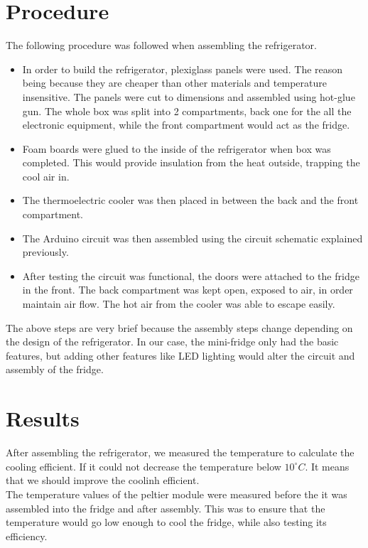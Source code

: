 \documentclass[12pt,onecolumn]{article}
\begin{document}
\section{Procedure}
The following procedure was followed when assembling the refrigerator. 
\begin{itemize}\itemsep -2pt
	\item In order to build the refrigerator, plexiglass panels were used. The reason being because they are cheaper than other materials and temperature insensitive. The panels were cut to dimensions and assembled using hot-glue gun. The whole box was split into 2 compartments, back one for the all the electronic equipment, while the front compartment would act as the fridge.
	\item Foam boards were glued to the inside of the refrigerator when box was completed. This would provide insulation from the heat outside, trapping the cool air in. 
	\item The thermoelectric cooler was then placed in between the back and the front compartment. 
	\item The Arduino circuit was then assembled using the circuit schematic explained previously. 
	\item After testing the circuit was functional, the doors were attached to the fridge in the front. The back compartment was kept open, exposed to air, in order maintain air flow. The hot air from the cooler was able to escape easily. 
\end{itemize}


The above steps are very brief because the assembly steps change depending on the design of the refrigerator. In our case, the mini-fridge only had the basic features, but adding other features like LED lighting would alter the circuit and assembly of the fridge.  

\section{Results}
After assembling the refrigerator, we measured the temperature to calculate the cooling efficient. If it could not decrease the temperature below $10^{\circ}C$. It means that we should improve the coolinh efficient.\\  
The temperature values of the peltier module were measured before the it was assembled into the fridge and after assembly. This was to ensure that the temperature would go low enough to cool the fridge, while also testing its efficiency. 
\end{document}

